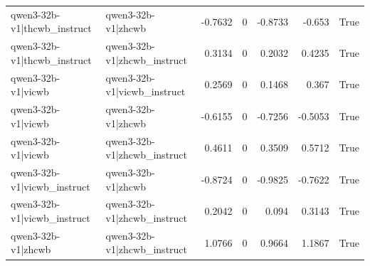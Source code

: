 \begin{table}
\begin{tabular}{l l r r r r l}
qwen3-32b-v1|thcwb_instruct & qwen3-32b-v1|zhcwb & -0.7632 & 0 & -0.8733 & -0.653 & True \\
qwen3-32b-v1|thcwb_instruct & qwen3-32b-v1|zhcwb_instruct & 0.3134 & 0 & 0.2032 & 0.4235 & True \\
qwen3-32b-v1|vicwb & qwen3-32b-v1|vicwb_instruct & 0.2569 & 0 & 0.1468 & 0.367 & True \\
qwen3-32b-v1|vicwb & qwen3-32b-v1|zhcwb & -0.6155 & 0 & -0.7256 & -0.5053 & True \\
qwen3-32b-v1|vicwb & qwen3-32b-v1|zhcwb_instruct & 0.4611 & 0 & 0.3509 & 0.5712 & True \\
qwen3-32b-v1|vicwb_instruct & qwen3-32b-v1|zhcwb & -0.8724 & 0 & -0.9825 & -0.7622 & True \\
qwen3-32b-v1|vicwb_instruct & qwen3-32b-v1|zhcwb_instruct & 0.2042 & 0 & 0.094 & 0.3143 & True \\
qwen3-32b-v1|zhcwb & qwen3-32b-v1|zhcwb_instruct & 1.0766 & 0 & 0.9664 & 1.1867 & True \\
\bottomrule
\end{tabular}
\end{table}
